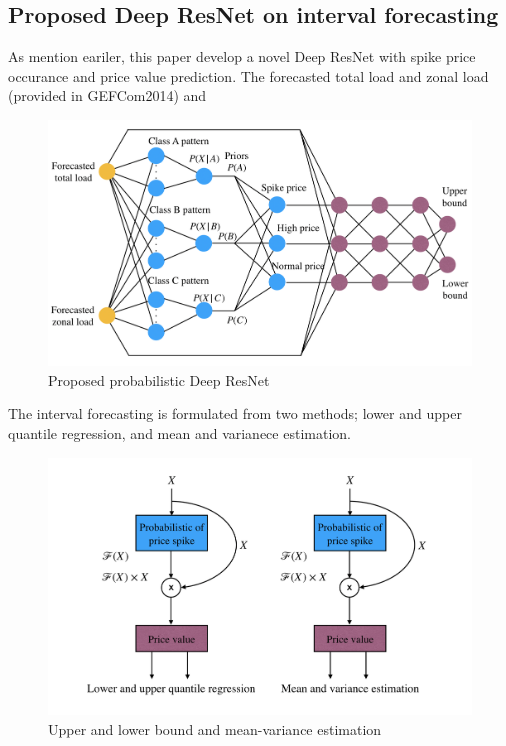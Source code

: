 \documentclass[review]{elsarticle}
\begin{document}
    \subsection{Proposed Deep ResNet on interval forecasting}
      As mention eariler, this paper develop a novel Deep ResNet with spike price occurance and price  value prediction. The forecasted total load and zonal load (provided in GEFCom2014) and

      \begin{figure}[H]
        \includegraphics[width=12cm]{proposed_PDRNN}
        \caption{Proposed probabilistic Deep ResNet}
        \label{Fig:proposed_PDRNN}
        \centering
      \end{figure}

      The interval forecasting is formulated from two methods; lower and upper quantile regression, and mean and varianece estimation.
      \begin{figure}[H]
        \includegraphics[width=12cm]{UB_LB_MV_PDRNN}
        \caption{Upper and lower bound and mean-variance estimation}
        \label{Fig:UB_LB_MV_PDRNN}
        \centering
      \end{figure}
\end{document}
